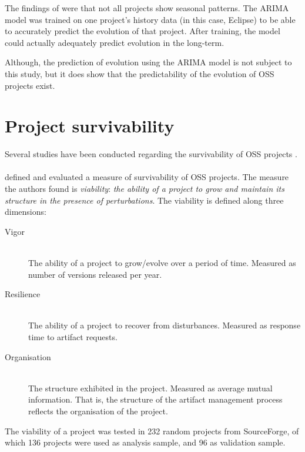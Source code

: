 The findings of \citeauthor{goulao} were that not all projects show seasonal
patterns. The ARIMA model was trained on one project's history data (in this
case, Eclipse) to be able to accurately predict the evolution of that project.
After training, the model could actually adequately predict evolution in the
long-term.

Although, the prediction of evolution using the ARIMA model is not subject to
this study, but it does show that the predictability of the evolution of OSS
projects exist.



\section{Project survivability}
Several studies have been conducted regarding the survivability of OSS projects
\cite{raja2012, samoladas2010, wang2012}.

\paragraph{}
\citet{raja2012} defined and evaluated a measure of survivability of OSS
projects. The measure the authors found is \textit{viability}: \textit{the
ability of a project to grow and maintain its structure in the presence of
perturbations}. The viability is defined along three dimensions:

\begin{description}
	\item[Vigor] \hfill \\ The ability of a project to grow/evolve over a period of
		time. Measured as number of versions released per year.

	\item[Resilience] \hfill \\ The ability of a project to recover from
		disturbances. Measured as response time to artifact requests.

	\item[Organisation] \hfill \\ The structure exhibited in the project. Measured
		as average mutual information. That is, the structure of the artifact
		management process reflects the organisation of the project.
\end{description}

\noindent
The viability of a project was tested in 232 random projects from SourceForge,
of which 136 projects were used as analysis sample, and 96 as validation
sample.

